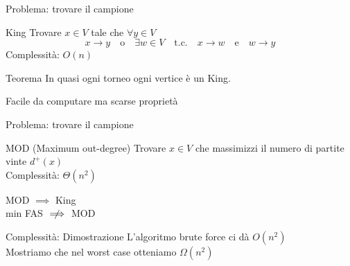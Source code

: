 \documentclass{beamer}
\begin{document}
\begin{frame}{Problema: trovare il campione}
	\begin{block}{King}
		Trovare $x \in V $ tale che $\forall y \in V$
		$$ x \longrightarrow y \quad \text{o} \quad \exists w \in V \quad \text{t.c.} \quad x \longrightarrow w \quad \text{e} \quad w \longrightarrow y $$
		Complessità: $O\left(n\right)$ \\
		\pause
		\begin{center}
			\begin{minipage}{.7 \textwidth}
				\begin{block}{Teorema}
					In quasi ogni torneo ogni vertice è un King.
				\end{block}
			\end{minipage}
		\end{center}
		Facile da computare ma scarse proprietà
	\end{block}
\end{frame}

\begin{frame}{Problema: trovare il campione}
	\begin{block}{MOD (Maximum out-degree)}
		Trovare $ x \in V$ che massimizzi il numero di partite vinte $d^+\left(x\right)$ \\
		\vspace{3mm}
		Complessità: $\Theta\left(n^2\right)$ \\
		\begin{center}
			MOD $\implies$ King \\
			\vspace{3mm}
			min FAS $\centernot\implies$ MOD \\
		\end{center}
	\end{block}
	\pause
	\begin{block}{Complessità: Dimostrazione}
		L'algoritmo brute force ci dà $O\left(n^2\right)$ \\
		\vspace{3mm}
		Mostriamo che nel worst case otteniamo $\Omega\left(n^2\right)$
		\vspace{3mm}
	\end{block}
\end{frame}
\end{document}
